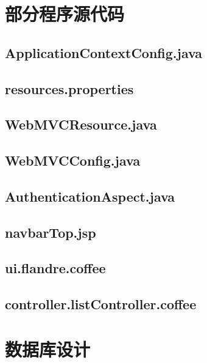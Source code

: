 
\chapter{部分程序源代码}
\section{ApplicationContextConfig.java}\label{sec:ApplicationContextConfig}

\section{resources.properties}\label{sec:resources}

\section{WebMVCResource.java}\label{sec:WebMVCResource}

\section{WebMVCConfig.java}\label{sec:WebMVCConfig}

\section{AuthenticationAspect.java}\label{sec:AuthenticationAspect}

\section{navbarTop.jsp}\label{sec:navbarTop}

\section{ui.flandre.coffee}\label{sec:flandre}

\section{controller.listController.coffee}\label{sec:listController}

\chapter{数据库设计}\label{sec:databasediagram}
